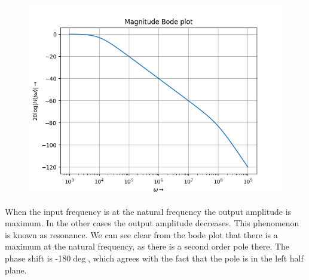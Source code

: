 \documentclass[11pt, a4paper]{article}
\begin{document}
\begin{figure}[!tbh]
   	\centering
   	\includegraphics[scale=0.5]{Figure_4.png}
   	\label{fig:32}
   \end{figure}
{
When the input frequency is at the natural frequency the output amplitude is maximum.
In the other cases the output amplitude decreases.
This phenomenon is known as resonance.
We can see clear from the bode plot that there is a maximum at the natural frequency, as there is a second order pole there.
The phase shift is -180$\deg$, which agrees with the fact that the pole is in the left half plane.
}
\end{document}
